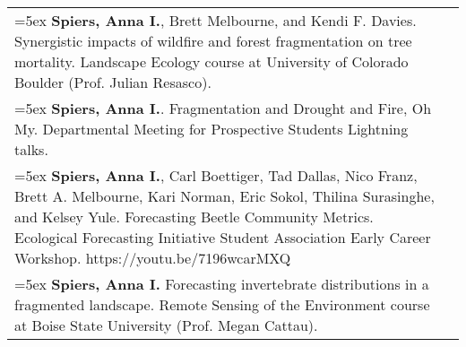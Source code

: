 \begin{longtable}{@{}>{\raggedright}p{5.25in} @{} >{\raggedleft}X@{}}

\hangindent=5ex \textbf{Spiers, Anna I.}, Brett Melbourne, and Kendi F. Davies. Synergistic impacts of wildfire and forest fragmentation on tree mortality. Landscape Ecology course at University of Colorado Boulder (Prof. Julian Resasco). & 2023 \tabularnewline %

\hangindent=5ex \textbf{Spiers, Anna I.}. Fragmentation and Drought and Fire, Oh My. Departmental Meeting for Prospective Students Lightning talks. & 2022 \tabularnewline %

\hangindent=5ex \textbf{Spiers, Anna I.}, Carl Boettiger, Tad Dallas, Nico Franz, Brett A. Melbourne, Kari Norman, Eric Sokol, Thilina Surasinghe, and Kelsey Yule. Forecasting Beetle Community Metrics. Ecological Forecasting Initiative Student Association Early Career Workshop. https://youtu.be/7196wcarMXQ & 2021 \tabularnewline %

\hangindent=5ex \textbf{Spiers, Anna I.} Forecasting invertebrate distributions in a fragmented landscape. Remote Sensing of the Environment course at Boise State University (Prof. Megan Cattau). & 2020  \tabularnewline %

\end{longtable}
